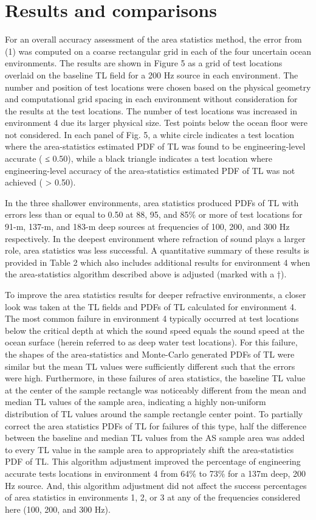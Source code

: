 \section{Results and comparisons} \label{section:asuq_astats_results}
For an overall accuracy assessment of the area statistics method, the
error from (1) was computed on a coarse rectangular grid in each of
the four uncertain ocean environments. The results are shown in Figure
5 as a grid of test locations overlaid on the baseline TL field for a
200 Hz source in each environment. The number and position of test
locations were chosen based on the physical geometry and computational
grid spacing in each environment without consideration for the results
at the test locations. The number of test locations was increased in
environment 4 due its larger physical size. Test points below the
ocean floor were not considered. In each panel of Fig. 5, a white
circle indicates a test location where the area-statistics estimated
PDF of TL was found to be engineering-level accurate ( ≤ 0.50), while
a black triangle indicates a test location where engineering-level
accuracy of the area-statistics estimated PDF of TL was not achieved (
> 0.50).

In the three shallower environments, area statistics produced PDFs of
TL with errors less than or equal to 0.50 at 88, 95, and 85\% or more
of test locations for 91-m, 137-m, and 183-m deep sources at
frequencies of 100, 200, and 300 Hz respectively. In the deepest
environment where refraction of sound plays a larger role, area
statistics was less successful. A quantitative summary of these
results is provided in Table 2 which also includes additional results
for environment 4 when the area-statistics algorithm described above
is adjusted (marked with a †).

To improve the area statistics results for deeper refractive
environments, a closer look was taken at the TL fields and PDFs of TL
calculated for environment 4. The most common failure in environment 4
typically occurred at test locations below the critical depth at which
the sound speed equals the sound speed at the ocean surface (herein
referred to as deep water test locations). For this failure, the
shapes of the area-statistics and Monte-Carlo generated PDFs of TL
were similar but the mean TL values were sufficiently different such
that the errors were high. Furthermore, in these failures of area
statistics, the baseline TL value at the center of the sample
rectangle was noticeably different from the mean and median TL values
of the sample area, indicating a highly non-uniform distribution of TL
values around the sample rectangle center point. To partially correct
the area statistics PDFs of TL for failures of this type, half the
difference between the baseline and median TL values from the AS
sample area was added to every TL value in the sample area to
appropriately shift the area-statistics PDF of TL. This algorithm
adjustment improved the percentage of engineering accurate tests
locations in environment 4 from 64\% to 73\% for a 137m deep, 200 Hz
source. And, this algorithm adjustment did not affect the success
percentages of area statistics in environments 1, 2, or 3 at any of
the frequencies considered here (100, 200, and 300 Hz).

